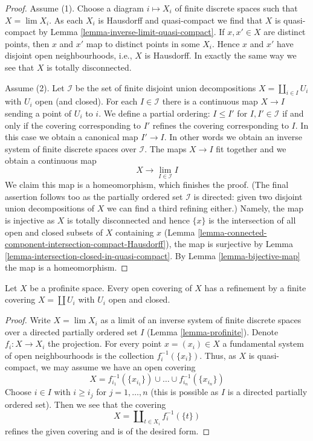 \begin{proof}
Assume (1). Choose a diagram $i \mapsto X_i$ of finite discrete spaces
such that $X = \lim X_i$. As each $X_i$ is Hausdorff and quasi-compact we find
that $X$ is quasi-compact by Lemma \ref{lemma-inverse-limit-quasi-compact}.
If $x, x' \in X$ are distinct points, then $x$ and $x'$ map to
distinct points in some $X_i$. Hence $x$ and $x'$ have disjoint
open neighbourhoods, i.e., $X$ is Hausdorff. In exactly the same way
we see that $X$ is totally disconnected.

\medskip\noindent
Assume (2). Let $\mathcal{I}$ be the set of finite disjoint union
decompositions $X = \coprod_{i \in I} U_i$ with $U_i$ open (and closed).
For each $I \in \mathcal{I}$ there is a continuous map
$X \to I$ sending a point of $U_i$ to $i$. We define a partial
ordering: $I \leq I'$ for $I, I' \in \mathcal{I}$ if and only
if the covering corresponding to $I'$ refines the covering corresponding
to $I$. In this case we obtain a canonical map $I' \to I$. In other
words we obtain an inverse system of finite discrete spaces over $\mathcal{I}$.
The maps $X \to I$ fit together and we obtain a continuous map
$$
X \longrightarrow \lim_{I \in \mathcal{I}} I
$$
We claim this map is a homeomorphism, which finishes the proof.
(The final assertion follows too as the partially ordered set
$\mathcal{I}$ is directed: given two disjoint union decompositions
of $X$ we can find a third refining either.)
Namely, the map is injective as $X$ is totally disconnected
and hence $\{x\}$ is the intersection of all open and closed subsets
of $X$ containing $x$
(Lemma \ref{lemma-connected-component-intersection-compact-Hausdorff}),
the map is surjective by
Lemma \ref{lemma-intersection-closed-in-quasi-compact}.
By Lemma \ref{lemma-bijective-map} the map is a homeomorphism.
\end{proof}

\begin{lemma}
\label{lemma-profinite-refine-open-covering}
Let $X$ be a profinite space. Every open covering of $X$ has a refinement
by a finite covering $X = \coprod U_i$ with $U_i$ open and closed.
\end{lemma}

\begin{proof}
Write $X = \lim X_i$ as a limit of an inverse system of finite discrete
spaces over a directed partially ordered set $I$ (Lemma \ref{lemma-profinite}).
Denote $f_i : X \to X_i$ the projection.
For every point $x = (x_i) \in X$ a fundamental system of open neighbourhoods
is the collection $f_i^{-1}(\{x_i\})$. Thus, as $X$ is quasi-compact, we may
assume we have an open covering
$$
X = f_{i_1}^{-1}(\{x_{i_1}\}) \cup \ldots \cup f_{i_n}^{-1}(\{x_{i_n}\})
$$
Choose $i \in I$ with $i \geq i_j$ for $j = 1, \ldots, n$ (this is possible
as $I$ is a directed partially ordered set). Then we see
that the covering
$$
X = \coprod\nolimits_{t \in X_i} f_i^{-1}(\{t\})
$$
refines the given covering and is of the desired form.
\end{proof}

